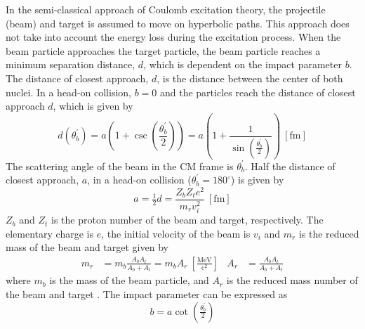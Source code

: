 \documentclass[twoside,english]{uiofysmaster/uiofysmaster}
\begin{document}
In the semi-classical approach of Coulomb excitation theory, the projectile (beam) and target is assumed to move on hyperbolic paths. 
This approach does not take into account the energy loss during the excitation process.
When the beam particle approaches the target particle, the beam particle reaches a minimum separation distance, $d$, which is dependent on the impact parameter $b$. 
The distance of closest approach, $d$, is the distance between the center of both nuclei. 
In a head-on collision, $b = 0$ and the particles reach the distance of closest approach $d$, which is given by
\begin{equation}
	d\left( \theta_b^{'} \right) = a \left( 1 + \csc \left( \frac{\theta_b^{'}}{2} \right) \right) = a \left( 1 + \frac{1}{\sin \left( \frac{\theta_b^{'}}{2} \right)} \right) ~[\text{fm}]
\end{equation}
The scattering angle of the beam in the CM frame is $\theta_b^{'}$.
Half the distance of closest approach, $a$, in a head-on collision ($\theta_b^{'} = 180^\circ$) is given by
\begin{equation}
	 a = \tfrac{1}{2} d = \frac{Z_b Z_t e^2}{m_r v_i^2} ~[\text{fm}]
\end{equation}
$Z_b$ and $Z_t$ is the proton number of the beam and target, respectively. 
The elementary charge is $e$, the initial velocity of the beam is $v_i$ and $m_r$ is the reduced mass of the beam and target given by
\begin{align}
	 m_r &= m_b \frac{A_b A_t}{A_b + A_t} = m_b A_r  ~\left[ \tfrac{\text{MeV}}{\text{c}^2} \right]
	 &
	 A_r &= \frac{A_b A_t}{A_b + A_t}
\end{align}
where $m_b$ is the mass of the beam particle, and $A_r$ is the reduced mass number of the beam and target \cite{RBass, EE-Coulex}. 
The impact parameter can be expressed as
\begin{equation}
	b = a \cot \left( \tfrac{\theta_b^{'}}{2} \right)
\end{equation}
\end{document}
